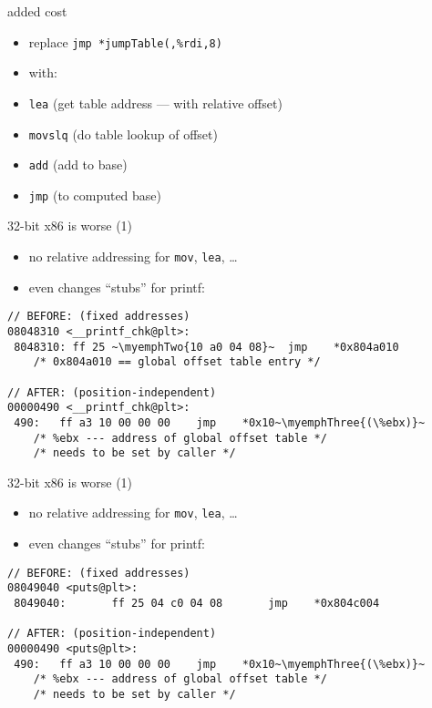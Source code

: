 \begin{frame}{added cost}
\begin{itemize}
    \item replace \texttt{jmp *jumpTable(,\%rdi,8)}
    \vspace{.5cm}
    \item with:
        \item \texttt{lea} (get table address --- with relative offset)
        \item \texttt{movslq} (do table lookup of offset)
        \item \texttt{add} (add to base)
        \item \texttt{jmp} (to computed base)
\end{itemize}

\end{frame}

\begin{frame}[fragile,label=x86Worse]{32-bit x86 is worse (1)}
    \begin{itemize}
    \item no relative addressing for {\tt mov}, {\tt lea}, \ldots
    \item even changes ``stubs'' for printf:
    \end{itemize}
\lstset{
    language=myasm,
    style=smaller,
    escapeinside=~~,
}
\begin{lstlisting}
// BEFORE: (fixed addresses)
08048310 <__printf_chk@plt>:
 8048310: ff 25 ~\myemphTwo{10 a0 04 08}~  jmp    *0x804a010
    /* 0x804a010 == global offset table entry */

// AFTER: (position-independent)
00000490 <__printf_chk@plt>:
 490:	ff a3 10 00 00 00    jmp    *0x10~\myemphThree{(\%ebx)}~
    /* %ebx --- address of global offset table */
    /* needs to be set by caller */
\end{lstlisting}
\end{frame}

\begin{frame}[fragile,label=x86Worse]{32-bit x86 is worse (1)}
    \begin{itemize}
    \item no relative addressing for {\tt mov}, {\tt lea}, \ldots
    \item even changes ``stubs'' for printf:
    \end{itemize}
\lstset{
    language=myasm,
    style=smaller,
    escapeinside=~~,
}
\begin{lstlisting}
// BEFORE: (fixed addresses)
08049040 <puts@plt>:
 8049040:       ff 25 04 c0 04 08       jmp    *0x804c004

// AFTER: (position-independent)
00000490 <puts@plt>:
 490:	ff a3 10 00 00 00    jmp    *0x10~\myemphThree{(\%ebx)}~
    /* %ebx --- address of global offset table */
    /* needs to be set by caller */
\end{lstlisting}
\end{frame}


